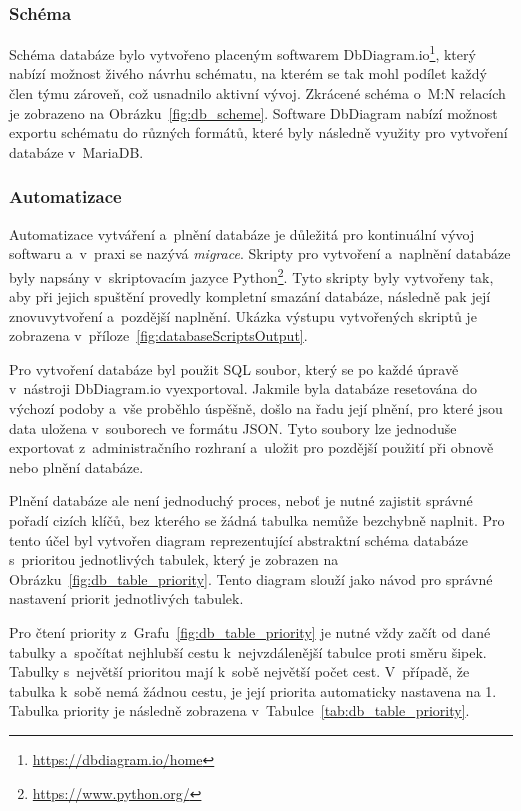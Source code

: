 \subsubsection*{Schéma}
\label{subsubsec:implementation-technologies-database-scheme}
Schéma databáze bylo vytvořeno placeným softwarem DbDiagram.io\footnote{\href{https://dbdiagram.io/home}{https://dbdiagram.io/home}}, který nabízí možnost živého návrhu schématu, na kterém se tak mohl podílet každý člen týmu zároveň, což usnadnilo aktivní vývoj. Zkrácené schéma o~M:N relacích je zobrazeno na Obrázku~\ref{fig:db_scheme}. Software DbDiagram nabízí možnost exportu schématu do různých formátů, které byly následně využity pro vytvoření databáze v~MariaDB\@.

\subsubsection*{Automatizace}
\label{subsubsec:implementation-technologies-database-automatization}
Automatizace vytváření a~plnění databáze je důležitá pro kontinuální vývoj softwaru a~v~praxi se nazývá \textit{migrace}. Skripty pro vytvoření a~naplnění databáze byly napsány v~skriptovacím jazyce Python\footnote{\href{https://www.python.org/}{https://www.python.org/}}. Tyto skripty byly vytvořeny tak, aby při jejich spuštění provedly kompletní smazání databáze, následně pak její znovuvytvoření a~pozdější naplnění. Ukázka výstupu vytvořených skriptů je zobrazena v~příloze~\ref{fig:databaseScriptsOutput}.

Pro vytvoření databáze byl použit SQL soubor, který se po každé úpravě v~nástroji DbDiagram.io vyexportoval. Jakmile byla databáze resetována do výchozí podoby a~vše proběhlo úspěšně, došlo na řadu její plnění, pro které jsou data uložena v~souborech ve formátu JSON. Tyto soubory lze jednoduše exportovat z~administračního rozhraní a~uložit pro pozdější použití při obnově nebo plnění databáze.

Plnění databáze ale není jednoduchý proces, neboť je nutné zajistit správné pořadí cizích klíčů, bez kterého se žádná tabulka nemůže bezchybně naplnit. Pro tento účel byl vytvořen diagram reprezentující abstraktní schéma databáze s~prioritou jednotlivých tabulek, který je zobrazen na Obrázku~\ref{fig:db_table_priority}. Tento diagram slouží jako návod pro správné nastavení priorit jednotlivých tabulek.

Pro čtení priority z~Grafu~\ref{fig:db_table_priority} je nutné vždy začít od dané tabulky a~spočítat nejhlubší cestu k~nejvzdálenější tabulce proti směru šipek. Tabulky s~největší prioritou mají k~sobě největší počet cest. V~případě, že tabulka k~sobě nemá žádnou cestu, je její priorita automaticky nastavena na 1. Tabulka priority je následně zobrazena v~Tabulce~\ref{tab:db_table_priority}.

